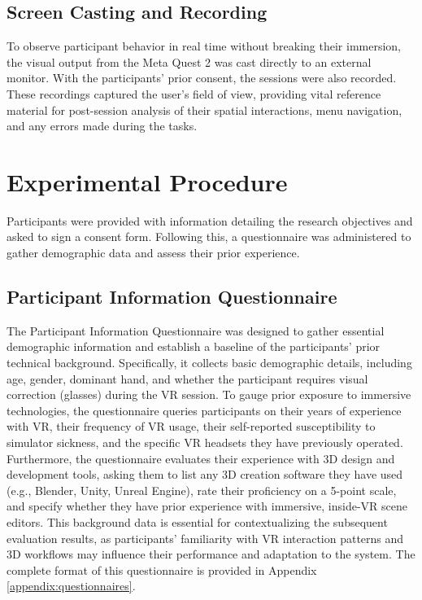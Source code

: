 \documentclass[inscr,ack,preface]{dithesis}
\begin{document}
\subsection{Screen Casting and Recording}
To observe participant behavior in real time without breaking their immersion, the visual output from the Meta Quest 2 was
cast directly to an external monitor. With the participants' prior consent, the sessions were also recorded.
These recordings captured the user's field of view, providing vital reference material for post-session analysis of their
spatial interactions, menu navigation, and any errors made during the tasks.

\section{Experimental Procedure}
Participants were provided with information detailing the research objectives and asked to sign a consent form.
Following this, a questionnaire was administered to gather demographic data and assess their prior experience.

\subsection{Participant Information Questionnaire}

The Participant Information Questionnaire was designed to gather essential demographic information
and establish a baseline of the participants' prior technical background.
Specifically, it collects basic demographic details, including age, gender, dominant hand, and
whether the participant requires visual correction (glasses) during the VR session.
To gauge prior exposure to immersive technologies,
the questionnaire queries participants on their years of experience with VR, their frequency of VR usage,
their self-reported susceptibility to simulator sickness, and the specific VR headsets they have previously operated.
Furthermore, the questionnaire evaluates their experience with 3D design and development tools,
asking them to list any 3D creation software they have used (e.g., Blender, Unity, Unreal Engine),
rate their proficiency on a 5-point scale, and specify whether they have prior experience with immersive, inside-VR scene editors.
This background data is essential for contextualizing the subsequent evaluation results, as participants'
familiarity with VR interaction patterns and 3D workflows may influence their performance and adaptation to the system.
The complete format of this questionnaire is provided in Appendix \ref{appendix:questionnaires}.
\end{document}
